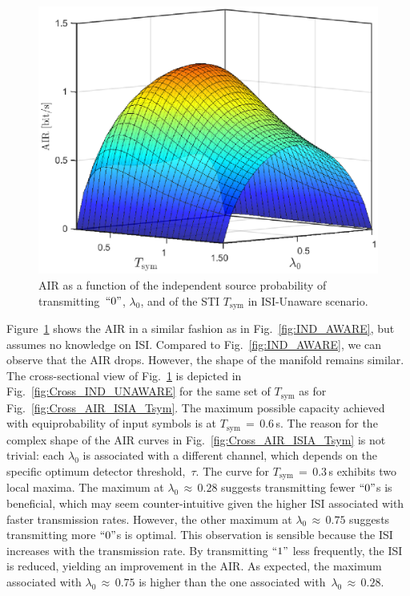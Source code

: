 \documentclass[journal]{IEEEtranTCOM}
\begin{document}
\begin{figure}
    \centering
    \includegraphics[width=1\linewidth]{Figures/AIR_INDP_Unaware.eps}
    \caption{AIR as a function of the independent source probability of transmitting~$``0"$, $\lambda_0$, and of the STI $T_{\mathrm{sym}}$ in ISI-Unaware scenario.}
    \label{fig:IND_UNAWARE}
\end{figure}
\par Figure~\ref{fig:IND_UNAWARE} shows the AIR in a similar fashion as in Fig.~\ref{fig:IND_AWARE}, but assumes no knowledge on ISI. Compared to Fig.~\ref{fig:IND_AWARE}, we can observe that the AIR drops. However, the shape of the manifold remains similar. The cross-sectional view of Fig.~\ref{fig:IND_UNAWARE} is depicted in Fig.~\ref{fig:Cross_IND_UNAWARE} for the same set of $T_{\mathrm{sym}}$ as for Fig.~\ref{fig:Cross_AIR_ISIA_Tsym}. The maximum possible capacity achieved with equiprobability of input symbols is at $T_{\mathrm{sym}}$$\,=\,$$0.6$\,s. The reason for the complex shape of the AIR curves in Fig.~\ref{fig:Cross_AIR_ISIA_Tsym} is not trivial: each $\lambda_0$ is associated with a different channel,  which depends on the specific optimum detector threshold,~$\tau$. The curve for $T_{\mathrm{sym}}$$\,=\,$$0.3$\,s exhibits two local maxima. The maximum at $\lambda_{0}$$\,\approx\,$$0.28$ suggests transmitting fewer $``0"$s is beneficial, which may seem counter-intuitive given the higher ISI associated with faster transmission rates. However, the other maximum at $\lambda_{0}$$\,\approx\,$$0.75$ suggests transmitting more $``0"$s is optimal. This observation is sensible because the ISI increases with the transmission rate. By transmitting $``1"$ less frequently, the ISI is reduced, yielding an improvement in the AIR. As expected, the maximum associated with $\lambda_{0}$$\,\approx\,$$0.75$ is higher than the one associated with~$\lambda_{0}$$\,\approx\,$$0.28$.
\end{document}
